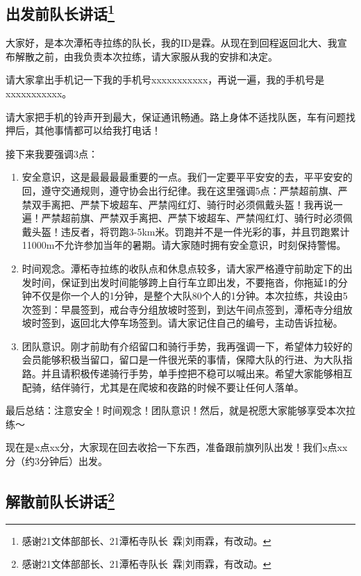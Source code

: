 \documentclass[UTF8]{ctexart}
\begin{document}
\subsection[出发前队长讲话]{出发前队长讲话\protect\footnote{感谢21文体部部长、21潭柘寺队长\ 霖|刘雨霖，有改动。}}

大家好，是本次潭柘寺拉练的队长，我的ID是霖。从现在到回程返回北大、我宣布解散之前，由我负责本次拉练，请大家服从我的安排和决定。

请大家拿出手机记一下我的手机号xxxxxxxxxxx，再说一遍，我的手机号是xxxxxxxxxxx。

请大家把手机的铃声开到最大，保证通讯畅通。路上身体不适找队医，车有问题找押后，其他事情都可以给我打电话！

接下来我要强调3点：
\begin{enumerate}[nosep,left=4em]
    \item 安全意识，这是最最最最重要的一点。我们一定要平平安安的去，平平安安的回，遵守交通规则，遵守协会出行纪律。我在这里强调5点：严禁超前旗、严禁双手离把、严禁下坡超车、严禁闯红灯、骑行时必须佩戴头盔！我再说一遍！严禁超前旗、严禁双手离把、严禁下坡超车、严禁闯红灯、骑行时必须佩戴头盔！违反者，将罚跑3-5km米。罚跑并不是一件光彩的事，并且罚跑累计11000m不允许参加当年的暑期。请大家随时拥有安全意识，时刻保持警惕。
    \item 时间观念。潭柘寺拉练的收队点和休息点较多，请大家严格遵守前助定下的出发时间，保证到出发时间能够跨上自行车立即出发，不要拖沓，你拖延1的分钟不仅是你一个人的1分钟，是整个大队80个人的1分钟。本次拉练，共设由5次签到：早晨签到，戒台寺分组放坡时签到，到达午间点签到，潭柘寺分组放坡时签到，返回北大停车场签到。请大家记住自己的编号，主动告诉拉秘。
    \item 团队意识。刚才前助有介绍留口和骑行手势，我再强调一下，希望体力较好的会员能够积极当留口，留口是一件很光荣的事情，保障大队的行进、为大队指路。并且请积极传递骑行手势，单手控把不稳可以喊出来。希望大家能够相互配骑，结伴骑行，尤其是在爬坡和夜路的时候不要让任何人落单。
\end{enumerate}

最后总结：注意安全！时间观念！团队意识！然后，就是祝愿大家能够享受本次拉练～

现在是x点xx分，大家现在回去收拾一下东西，准备跟前旗列队出发！我们x点xx分（约3分钟后）出发。

\subsection[解散前队长讲话]{解散前队长讲话\protect\footnote{感谢21文体部部长、21潭柘寺队长\ 霖|刘雨霖，有改动。}}
\end{document}
